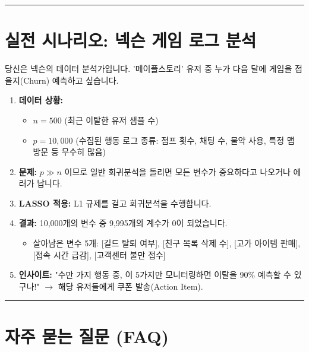 \documentclass[11pt,a4paper]{book}
\theoremstyle{definition}
\begin{document}
\vspace{0.5cm}\hrule\vspace{0.5cm}

\section{실전 시나리오: 넥슨 게임 로그 분석}

\begin{storybox}[title={Scenario: 이탈 유저를 찾아라}]
당신은 넥슨의 데이터 분석가입니다. '메이플스토리' 유저 중 누가 다음 달에 게임을 접을지(Churn) 예측하고 싶습니다.
\end{storybox}

\begin{enumerate}
    \item \textbf{데이터 상황:}
    \begin{itemize}
        \item $n = 500$ (최근 이탈한 유저 샘플 수)
        \item $p = 10,000$ (수집된 행동 로그 종류: 점프 횟수, 채팅 수, 물약 사용, 특정 맵 방문 등 무수히 많음)
    \end{itemize}
    \item \textbf{문제:} $p \gg n$ 이므로 일반 회귀분석을 돌리면 모든 변수가 중요하다고 나오거나 에러가 납니다.
    
    \item \textbf{LASSO 적용:} L1 규제를 걸고 회귀분석을 수행합니다.
    
    \item \textbf{결과:} 10,000개의 변수 중 9,995개의 계수가 0이 되었습니다.
    \begin{itemize}
        \item 살아남은 변수 5개: [길드 탈퇴 여부], [친구 목록 삭제 수], [고가 아이템 판매], [접속 시간 급감], [고객센터 불만 접수]
    \end{itemize}
    
    \item \textbf{인사이트:} "수만 가지 행동 중, 이 5가지만 모니터링하면 이탈을 90\% 예측할 수 있구나!" $\rightarrow$ 해당 유저들에게 쿠폰 발송(Action Item).
\end{enumerate}

\vspace{0.5cm}\hrule\vspace{0.5cm}

\section{자주 묻는 질문 (FAQ)}
\end{document}
